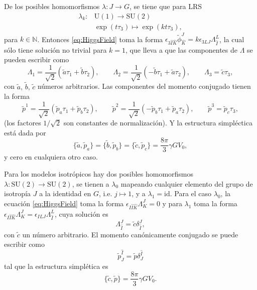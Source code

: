 De los posibles homomorfismos $\lambda: J \longrightarrow G$, se tiene que para LRS
%
\begin{align*}
\lambda_{k}: & \mathrm{U}(1) \longrightarrow \mathrm{SU}(2) \\
& \exp(t \tau_{3}) \longmapsto \exp(k t \tau_{3}),
\end{align*}
%
para $k \in \mathbb{N}$. Entonces \eqref{eq:HiggsField} toma la forma $\epsilon_{3 \hat{I} \hat{K}} \tilde{\phi}^{J}_{\hat{K}} = k \epsilon_{3LJ} \Lambda^{L}_{\hat{I}}$, la cual s\'{o}lo tiene soluci\'{o}n no trivial para $k = 1$, que lleva a que las componentes de $\Lambda$ se pueden escribir como
%
\begin{equation}
\Lambda_{1} = \frac{1}{\sqrt{2}} \left(\tilde{a} \tau_{1} + \tilde{b} \tau_{2} \right), \qquad
\Lambda_{2} = \frac{1}{\sqrt{2}} \left(-\tilde{b} \tau_{1} + \tilde{a} \tau_{2} \right), \qquad
\Lambda_{3} = \tilde{c} \tau_{3},
\end{equation}
%
con $\tilde{a}, \, \tilde{b}, \, \tilde{c}$ n\'{u}meros arbitrarios. Las componentes del momento conjugado tienen la forma
%
\begin{equation}
\tilde{p}^{1} = \frac{1}{\sqrt{2}} \left(\tilde{p}_{a} \tau_{1} + \tilde{p}_{b} \tau_{2} \right), \qquad
\tilde{p}^{2} = \frac{1}{\sqrt{2}} \left(-\tilde{p}_{b} \tau_{1} + \tilde{p}_{a} \tau_{2} \right), \qquad
\tilde{p}^{3} = \tilde{p}_{c} \tau_{3},
\end{equation}
%
(los factores $1/\sqrt{2}$ son constantes de normalizaci\'{o}n). Y la estructura simpl\'{e}ctica est\'{a} dada por
%
\begin{equation}
\{\tilde{a}, \tilde{p}_{a}\} = \{\tilde{b}, \tilde{p}_{b}\} = \{\tilde{c}, \tilde{p}_{c}\} = \frac{8 \pi}{3} \gamma G V_{0},
\end{equation}
%
y cero en cualquiera otro caso.

Para los modelos isotr\'{o}picos hay dos posibles homomorfismos $\lambda: \mathrm{SU}(2) \longrightarrow \mathrm{SU}(2)$, se tienen a $\lambda_{0}$ mapeando cualquier elemento del grupo de isotrop\'{i}a $J$ a la identidad en $G$, i.e. $j \longmapsto 1$, y a $\lambda_{1} = \mathrm{id}$. Para el caso $\lambda_{0}$, la ecuaci\'{o}n \eqref{eq:HiggsField} toma la forma $\epsilon_{I \hat{I} \hat{K}} \Lambda^{J}_{K} = 0$ y para $\lambda_{1}$ toma la forma $\epsilon_{I \hat{I} \hat{K}} \Lambda^{J}_{K} = \epsilon_{ILJ} \Lambda^{L}_{\hat{I}}$, cuya soluci\'{o}n es
%
\begin{equation}
\Lambda^{J}_{\hat{I}} = \tilde{c} \delta^{J}_{\hat{I}},
\end{equation}
%
con $\tilde{c}$ un n\'{u}mero arbitrario. El momento can\'{o}nicamente conjugado se puede escribir como
%
\begin{equation*}
\tilde{p}^{\hat{I}}_{J} = \tilde{p} \delta^{\hat{I}}_{J}
\end{equation*}
%
tal que la estructura simpl\'{e}tica es
%
\begin{equation}
\{\tilde{c}, \tilde{p}\} = \frac{8 \pi}{3} \gamma G V_{0}.
\end{equation}

